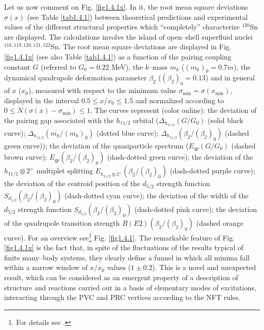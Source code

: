  Let us now  comment on Fig. \ref{fig1.4.1x}. In it, the root mean square deviations $\sigma(x)$ (see Table \ref{tab1.4.1}) between theoretical predictions  and experimental values of the different structural properties which ``completely'' characterize  $^{120}$Sn are displayed. The calculations involve the island of open--shell superfluid nuclei $^{118,119,120,121,122}$Sn. The root mean square deviations are displayed in Fig. \ref{fig1.4.1x} (see also Table \ref{tab1.4.1}) as a function of the pairing coupling constant $G$ (referred to $G_0 = 0.22$ MeV), the $k$--mass $m_k$ ($(m_k)_0 = 0.7 m$),  the dynamical quadrupole deformation parameter $\beta_2$ ($(\beta_{2})_0 = 0.13$)  and in general of $x$ ($x_0$), measured with respect to the minimum value $\sigma_{\textrm{min}} = \sigma (x_{\textrm{min}})$, displayed in the interval $0.5 \leq x/x_0 \leq 1.5$ and normalized according to $0 \leq N(\sigma(x) - \sigma_{\textrm{min}}) \leq 1$.
 The  curves represent (color online): the deviation of the  pairing gap associated with the $h_{11/2}$ orbital 
 ($\Delta_{h_{11/2}} (G/G_0)$ (solid black curve);  
 $\Delta_{h_{11/2}} (m_k/(m_k)_0)$ (dotted blue curve);  $\Delta_{h_{11/2}} (\beta_{2}/(\beta_{2})_0)$ (dashed green curve));
 the deviation of the quasiparticle spectrum ($E_{qp}(G/G_0)$ (dashed brown curve);  $E_{qp}(\beta_{2}/(\beta_{2})_0)$ (dash-dotted green curve);
 the deviation of the $h_{11/2}\otimes 2^+$ multiplet splitting  $E_{h_{11/2}\otimes 2^+}(\beta_{2}/(\beta_{2})_0)$ (dash-dotted purple curve); 
 the deviation of the  centroid position of the $d_{5/2}$ strength function $S_{d_{5/2}}(\beta_{2}/(\beta_{2})_0)$ (dash-dotted cyan curve); 
 the deviation of the width of the $d_{5/2}$ strength function  $S_{d_{5/2}} (\beta_{2}/(\beta_{2})_0)$ (dash-dotted pink curve);
 the deviation  of the  quadrupole transition strength  $B(E2) (\beta_{2}/(\beta_{2})_0)$ (dashed orange curve). For an overview see\footnote{For details see \cite{Idini:15}.} Fig. \ref{fig1.4.1}.
 The remarkable feature of Fig. \ref{fig1.4.1x} is the fact that, in spite of the fluctuations of the results typical of finite  many--body systems, they clearly define a funnel in which all minima fall within a narrow window of $x/x_0$ values ($1 \pm 0.2$). This is a novel and unexpected result, which can be considered as an emergent property of a description of structure and reactions carried out in a basis of elementary modes of excitations, interacting through the PVC and PRC vertices according to the NFT rules.
 
 
 
